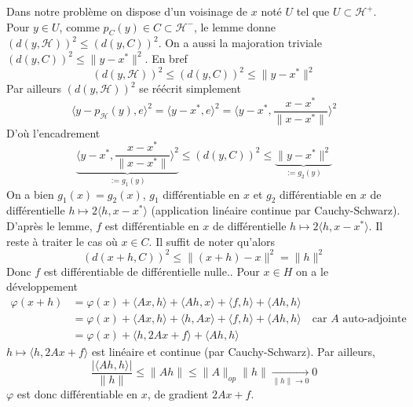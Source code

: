 \documentclass{report}
\begin{document}
\noindent Dans notre problème on dispose d'un voisinage de $x$ noté $U$ tel que $U\subset \mathcal H^+$. Pour $y\in U$, comme $p_C(y)\in C\subset \mathcal  H^-$, le lemme donne $(d(y,\mathcal H))^2\leq (d(y,C))^2$. On a aussi la majoration triviale $(d(y,C))^2\leq \|y-x^*\|^2$. En bref $$(d(y,\mathcal H))^2\leq (d(y,C))^2\leq \|y-x^*\|^2$$
Par ailleurs $(d(y,\mathcal H))^2$ se réécrit simplement $$\langle y-p_{\mathcal H}(y),e\rangle^2  = \langle y-x^*,e\rangle^2 = \langle y-x^*,\frac{x-x^*}{\|x-x^*\|}\rangle^2 $$
D'où l'encadrement $$\underbrace{\langle y-x^*,\frac{x-x^*}{\|x-x^*\|}\rangle^2}_{:= g_1(y)}\leq (d(y,C))^2\leq \underbrace{\|y-x^*\|^2}_{:= g_2(y)}$$
On a bien $g_1(x)=g_2(x)$, $g_1$ différentiable en $x$ et $g_2$ différentiable en $x$ de différentielle $h\mapsto 2\langle h,x-x^* \rangle$ (application linéaire continue par Cauchy-Schwarz).\newline
D'après le lemme, $f$ est différentiable en $x$ de différentielle $h\mapsto 2\langle h,x-x^* \rangle$.\newline \newline
Il reste à traiter le cas où $x\in C$. Il suffit de noter qu'alors $$(d(x+h,C))^2\leq \|(x+h)-x\|^2=\|h\|^2$$
Donc $f$ est différentiable de différentielle nulle.\newline {}. Pour $x\in H$ on a le développement 
$$\begin{aligned}
\varphi(x+h) &= \varphi(x) + \langle Ax,h\rangle + \langle Ah,x\rangle + \langle f,h\rangle + \langle Ah,h\rangle\\
&= \varphi(x) + \langle Ax,h\rangle + \langle h,Ax\rangle + \langle f,h\rangle + \langle Ah,h\rangle \quad \text{car }A \text{ auto-adjointe} \\
&= \varphi(x) + \langle h, 2Ax + f\rangle +\langle Ah,h\rangle
\end{aligned}$$
$h\mapsto \langle h, 2Ax + f\rangle$ est linéaire et continue (par Cauchy-Schwarz). Par ailleurs, $$\frac{|\langle Ah,h\rangle|}{\|h\|}\leq \|Ah\|\leq \|A\|_{op}\|h\| \xrightarrow[\|h\|\to 0]{} 0$$
$\varphi$ est donc différentiable en $x$, de gradient $2Ax + f$.
\end{document}
